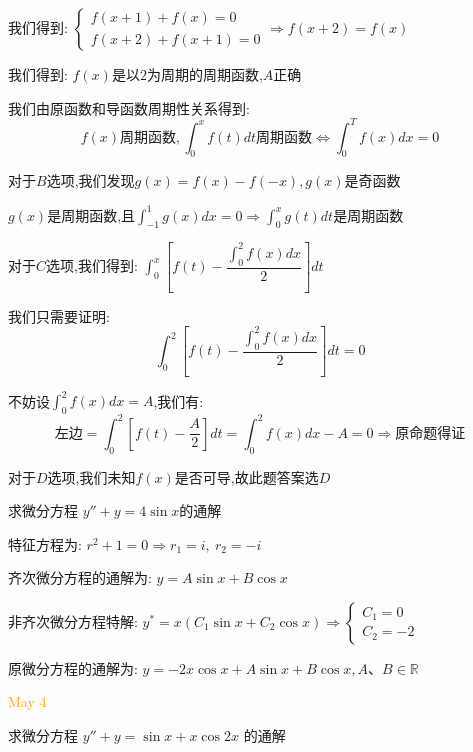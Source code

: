 \begin{solution}
	
	我们得到: $\left\lbrace 
	\begin{array}{l}
		f(x+1)+f(x)=0\\
		f(x+2)+f(x+1)=0
	\end{array}
	\right. \Rightarrow f(x+2)=f(x)$
	
	我们得到: $f(x)$是以$2$为周期的周期函数,$A$正确
	
	我们由原函数和导函数周期性关系得到: 
	$$f(x)\text{周期函数},\int_{0}^{x}f(t)dt\text{周期函数}\Leftrightarrow \int_{0}^{T}f(x)dx=0$$
	
	对于$B$选项,我们发现$g(x)=f(x)-f(-x),g(x)\text{是奇函数}$
	
	$g(x)\text{是周期函数}$,且$\int_{-1}^{1}g(x)dx=0\Rightarrow \int_{0}^{x}g(t)dt\text{是周期函数}$
	
	对于$C$选项,我们得到: $\int_{0}^{x}[f(t)-\dfrac{\int_{0}^{2}f(x)dx}{2}]dt$
	
	我们只需要证明: 
	$$\int_{0}^{2}[f(t)-\frac{\int_{0}^{2}f(x)dx}{2}]dt=0$$
	
	不妨设$\int_{0}^{2}f(x)dx=A$,我们有: 
	$$\text{左边}=\int_{0}^{2}[f(t)-\frac{A}{2}]dt=\int_{0}^{2}f(x)dx-A=0\Rightarrow \text{原命题得证}$$
	
	对于$D$选项,我们未知$f(x)$是否可导,故此题答案选$D$
\end{solution}

\begin{example}[][Exam: 31.1.6]
	求微分方程 $y''+y=4\sin x$的通解
\end{example}

\begin{solution}
	
	特征方程为: $r^2+1=0\Rightarrow r_{1}=i,\ r_{2}=-i$
	
	齐次微分方程的通解为: $y=A\sin x+B\cos x$
	
	非齐次微分方程特解: $y^{*}=x(C_{1}\sin x+C_{2}\cos x)\Rightarrow \left\lbrace 
	\begin{array}{l}
		C_{1}=0\\
		C_{2}=-2
	\end{array}
	\right. $
	
	原微分方程的通解为: $y=-2x\cos x+A\sin x+B\cos x,A\text{、}B\in \mathbb{R}$
\end{solution}


\textcolor{orange}{May 4}

\begin{example}[][Exam: 31.1.7]
	求微分方程 $y''+y=\sin x+x\cos 2x$ 的通解
\end{example}

